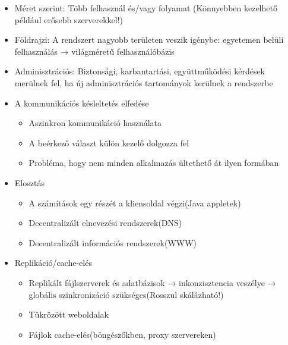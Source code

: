 \documentclass[12pt]{article}
\begin{document}
\begin{description}[style=unboxed]
        \begin{itemize}
            \item Méret szerint: Több felhasznál és/vagy folyamat  (Könnyebben
                kezelhető például erősebb szerverekkel!)
            \item Földrajzi: A rendszert nagyobb területen veszik igénybe:
                egyetemen belüli felhasználás → világméretű felhasználóbázis
            \item Adminisztrációs: Biztonsági, karbantartási, együttműködési
                kérdések merülnek fel, ha új adminisztrációs tartományok kerülnek
                a rendszerbe
        \end{itemize}
    \item[Ismertess egy technikát, amelynek célja az átméretezhetőség
        megvalósítása.]
        \hfill
        \begin{itemize}
            \item A kommunikációs késleltetés elfedése
                \begin{itemize}
                    \item Aszinkron kommunikáció használata
                    \item A beérkező választ külön kezelő dolgozza fel
                    \item Probléma, hogy nem minden alkalmazás ültethető át ilyen formában
                \end{itemize}
            \item Elosztás 
                \begin{itemize}
                    \item A számítások egy részét a kliensoldal végzi(Java
                        appletek)
                    \item Decentralizált elnevezési rendszerek(DNS)
                    \item Decentralizált információs rendszerek(WWW)
                \end{itemize}
            \item Replikáció/cache-elés
                \begin{itemize}
                    \item Replikált fájlszerverek és adatbázisok → inkonzisztencia veszélye → globális szinkronizáció szükséges(Rosszul skálázható!)
                    \item Tükrözött weboldalak
                    \item Fájlok cache-elés(böngészőkben, proxy szervereken)

\end{itemize}
\end{itemize}
\end{description}
\end{document}
